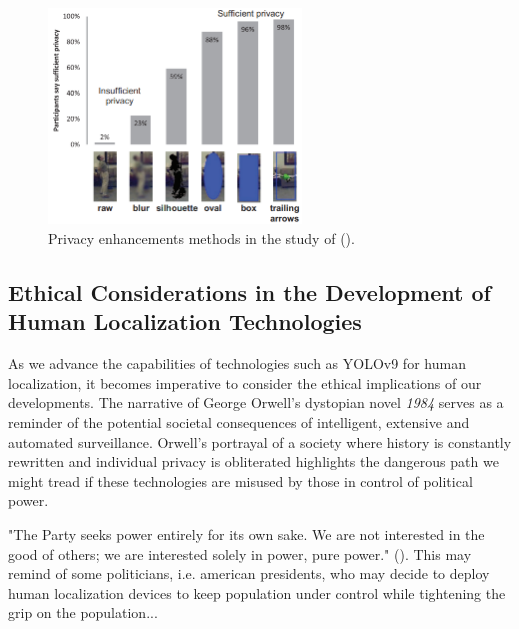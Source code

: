 \begin{figure}[H]
    \centering
    \includegraphics[width=0.6\textwidth]{Images/ed2012results.png}
    \caption[Privacy Enhancements Methods in the Study of \citeauthor{ed2012privacy_review} (\citeyear{ed2012privacy_review})]{\centering Privacy enhancements methods in the study of \citeauthor{ed2012privacy_review} (\citeyear{ed2012privacy_review}).}
    \label{fig:ed_results}
\end{figure}

\subsection{Ethical Considerations in the Development of Human Localization Technologies}
\label{sec:ethics_localization_tech}

As we advance the capabilities of technologies such as YOLOv9 for human localization, it becomes imperative to consider the ethical implications of our developments. The narrative of George Orwell's dystopian novel \textit{1984} serves as a reminder of the potential societal consequences of intelligent, extensive and automated surveillance. Orwell's portrayal of a society where history is constantly rewritten and individual privacy is obliterated highlights the dangerous path we might tread if these technologies are misused by those in control of political power.

"The Party seeks power entirely for its own sake. We are not interested in the good of others; we are interested solely in power, pure power." (\cite{orwell1984}). This may remind of some politicians, i.e. american presidents, who may decide to deploy human localization devices to keep population under control while tightening the grip on the population...

